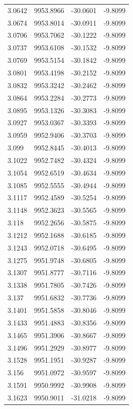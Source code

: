 \begin{table}[H]
\begin{tabular}{llll}
3.0642 & 9953.8966 & -30.0601 & -9.8099 \\
3.0674 & 9953.8014 & -30.0911 & -9.8099 \\
3.0706 & 9953.7062 & -30.1222 & -9.8099 \\
3.0737 & 9953.6108 & -30.1532 & -9.8099 \\
3.0769 & 9953.5154 & -30.1842 & -9.8099 \\
3.0801 & 9953.4198 & -30.2152 & -9.8099 \\
3.0832 & 9953.3242 & -30.2462 & -9.8099 \\
3.0864 & 9953.2284 & -30.2773 & -9.8099 \\
3.0895 & 9953.1326 & -30.3083 & -9.8099 \\
3.0927 & 9953.0367 & -30.3393 & -9.8099 \\
3.0959 & 9952.9406 & -30.3703 & -9.8099 \\
3.099 & 9952.8445 & -30.4013 & -9.8099 \\
3.1022 & 9952.7482 & -30.4324 & -9.8099 \\
3.1054 & 9952.6519 & -30.4634 & -9.8099 \\
3.1085 & 9952.5555 & -30.4944 & -9.8099 \\
3.1117 & 9952.4589 & -30.5254 & -9.8099 \\
3.1148 & 9952.3623 & -30.5565 & -9.8099 \\
3.118 & 9952.2656 & -30.5875 & -9.8099 \\
3.1212 & 9952.1688 & -30.6185 & -9.8099 \\
3.1243 & 9952.0718 & -30.6495 & -9.8099 \\
3.1275 & 9951.9748 & -30.6805 & -9.8099 \\
3.1307 & 9951.8777 & -30.7116 & -9.8099 \\
3.1338 & 9951.7805 & -30.7426 & -9.8099 \\
3.137 & 9951.6832 & -30.7736 & -9.8099 \\
3.1401 & 9951.5858 & -30.8046 & -9.8099 \\
3.1433 & 9951.4883 & -30.8356 & -9.8099 \\
3.1465 & 9951.3906 & -30.8667 & -9.8099 \\
3.1496 & 9951.2929 & -30.8977 & -9.8099 \\
3.1528 & 9951.1951 & -30.9287 & -9.8099 \\
3.156 & 9951.0972 & -30.9597 & -9.8099 \\
3.1591 & 9950.9992 & -30.9908 & -9.8099 \\
3.1623 & 9950.9011 & -31.0218 & -9.8099 \\

\end{tabular}
\end{table}
